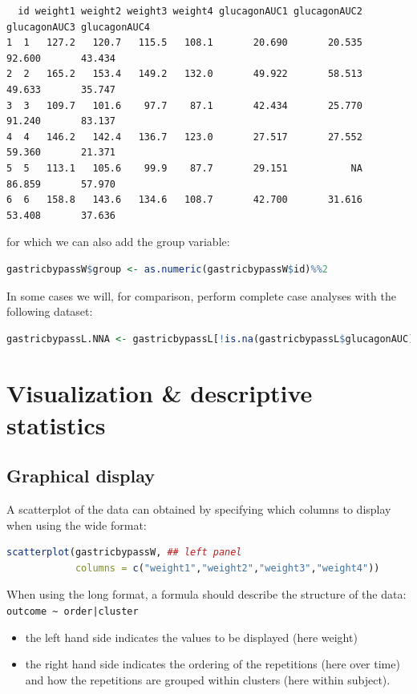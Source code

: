 \documentclass[12pt]{article}
\begin{document}
\label{}
\begin{verbatim}
  id weight1 weight2 weight3 weight4 glucagonAUC1 glucagonAUC2 glucagonAUC3 glucagonAUC4
1  1   127.2   120.7   115.5   108.1       20.690       20.535       92.600       43.434
2  2   165.2   153.4   149.2   132.0       49.922       58.513       49.633       35.747
3  3   109.7   101.6    97.7    87.1       42.434       25.770       91.240       83.137
4  4   146.2   142.4   136.7   123.0       27.517       27.552       59.360       21.371
5  5   113.1   105.6    99.9    87.7       29.151           NA       86.859       57.970
6  6   158.8   143.6   134.6   108.7       42.700       31.616       53.408       37.636
\end{verbatim}


for which we can also add the group variable:
\begin{lstlisting}[language=r,numbers=none]
gastricbypassW$group <- as.numeric(gastricbypassW$id)%%2
\end{lstlisting}

In some cases we will, for comparison, perform complete case analyses
with the following dataset:
\begin{lstlisting}[language=r,numbers=none]
gastricbypassL.NNA <- gastricbypassL[!is.na(gastricbypassL$glucagonAUC),]
\end{lstlisting}

\clearpage
\section{Visualization \& descriptive statistics}
\label{sec:org23b4921}
\subsection{Graphical display}
\label{sec:orgc6de954}

A scatterplot of the data can obtained by specifying which columns to
display when using the wide format:
\begin{lstlisting}[language=r,numbers=none]
scatterplot(gastricbypassW, ## left panel
            columns = c("weight1","weight2","weight3","weight4")) 
\end{lstlisting}

\noindent When using the long format, a formula should describe the
structure of the data: \texttt{outcome \textasciitilde{} order|cluster}
\begin{itemize}
\item the left hand side indicates the values to be displayed (here weight)
\item the right hand side indicates the ordering of the repetitions (here over time) and
how the repetitions are grouped within clusters (here within subject).
\end{itemize}
\end{document}
